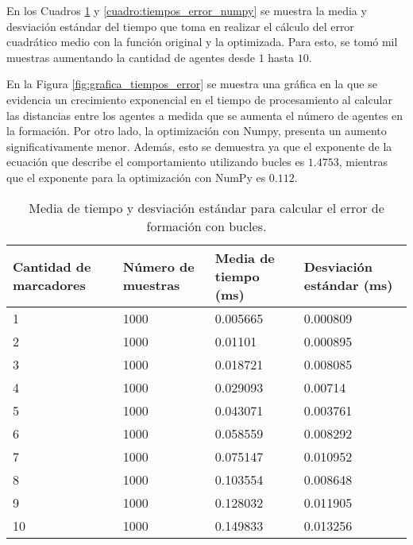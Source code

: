 En los Cuadros \ref{cuadro:tiempos_error_for} y \ref{cuadro:tiempos_error_numpy} se muestra la media y desviación estándar del tiempo que toma en realizar el cálculo del error cuadrático medio con la función original y la optimizada. Para esto, se tomó mil muestras aumentando la cantidad de agentes desde $1$ hasta $10$. 

En la Figura \ref{fig:grafica_tiempos_error} se muestra una gráfica en la que se evidencia un crecimiento exponencial en el tiempo de procesamiento al calcular las distancias entre los agentes a medida que se aumenta el número de agentes en la formación. Por otro lado, la optimización con Numpy, presenta un aumento significativamente menor. Además, esto se demuestra ya que el exponente de la ecuación que describe el comportamiento utilizando bucles es $1.4753$, mientras que el exponente para la optimización con NumPy es $0.112$.

\begin{table}[H]
	\centering
	\resizebox{\textwidth}{!} {
	\begin{tabular}{|l|l|l|l|}
		\hline
		\textbf{Cantidad de marcadores} & \textbf{Número de muestras} & \textbf{Media de tiempo (ms)} & \textbf{Desviación estándar (ms)} \\ \hline
		1 & 1000 & 0.005665 & 0.000809 \\ \hline
		2 & 1000 & 0.01101 & 0.000895 \\ \hline
		3 & 1000 & 0.018721 & 0.008085 \\ \hline
		4 & 1000 & 0.029093 & 0.00714 \\ \hline
		5 & 1000 & 0.043071 & 0.003761 \\ \hline
		6 & 1000 & 0.058559 & 0.008292 \\ \hline
		7 & 1000 & 0.075147 & 0.010952 \\ \hline
		8 & 1000 & 0.103554 & 0.008648 \\ \hline
		9 & 1000 & 0.128032 & 0.011905 \\ \hline
		10 & 1000 & 0.149833 & 0.013256 \\ \hline
	\end{tabular}}
	\caption{Media de tiempo y desviación estándar para calcular el error de formación con bucles.}
	\label{cuadro:tiempos_error_for}
\end{table}

